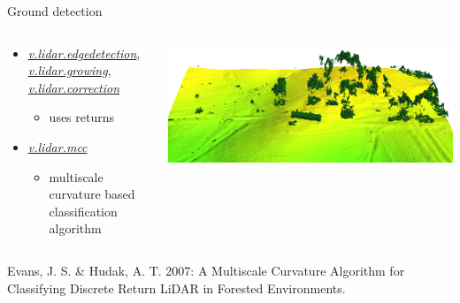 \documentclass[xcolor={dvipsnames,usenames},beamer,aspectratio=169]{beamer}
\newcommand{\gmodule}[1]{\href{http://grass.osgeo.org/grass71/manuals/#1.html}{\emph{#1}}}
\newcommand{\amodule}[1]{\href{http://grass.osgeo.org/grass70/manuals/addons/#1.html}{\emph{#1}}}
\begin{document}
\begin{frame}{Ground detection}

\begin{columns}
\begin{column}{0.28\textwidth}

\begin{itemize}
\item \gmodule{v.lidar.edgedetection}, \gmodule{v.lidar.growing}, \gmodule{v.lidar.correction}
\begin{itemize}
  \item uses returns
\end{itemize}

\item \amodule{v.lidar.mcc}
\begin{itemize}
  \item multiscale curvature based classification algorithm\footnotemark[1]
\end{itemize}

\end{itemize}

\end{column}
\begin{column}{0.7\textwidth}

\begin{center}
  \includegraphics[width=\textwidth]{grass/mcc_default}
\end{center}

\end{column}
\end{columns}

\bigskip

\footnoterule
\footnotesize
\footnotemark[1]
Evans, J. S. \& Hudak, A. T. 2007: A Multiscale Curvature Algorithm for Classifying Discrete Return LiDAR in Forested Environments.

\end{frame}
\end{document}
